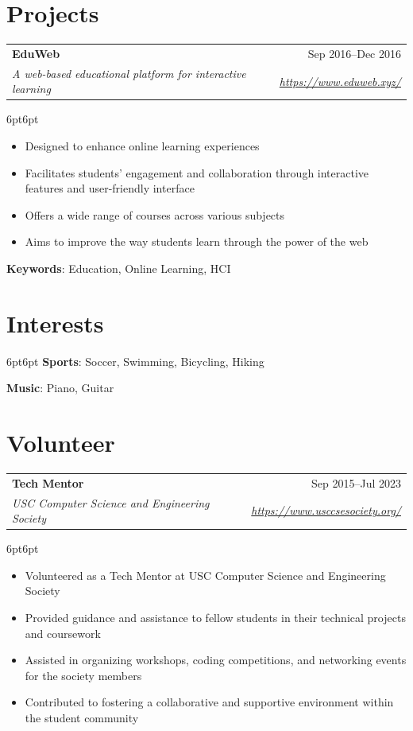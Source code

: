 \documentclass[a4paper,10pt]{article}
\makeatletter
\newcommand{\resumeSubheading}[4]{
  \begin{tabular*}{\textwidth}[t]{l@{\extracolsep{\fill}}r}
    \textbf{#1} & #2 \\
    \textit{#3} & \textit{#4} \\
  \end{tabular*}
}
\makeatother
\begin{document}
\section{Projects}
\resumeSubheading
{EduWeb}{Sep 2016–Dec 2016}
{A web-based educational platform for interactive learning}{\url{https://www.eduweb.xyz/}}
\begin{adjustwidth}{6pt}{6pt}
\begin{itemize}
\item Designed to enhance online learning experiences
\item Facilitates students' engagement and collaboration through interactive features and user-friendly interface
\item Offers a wide range of courses across various subjects
\item Aims to improve the way students learn through the power of the web
\end{itemize}
\textbf{Keywords}: Education, Online Learning, HCI
\end{adjustwidth}
\section{Interests}
\begin{adjustwidth}{6pt}{6pt}
\textbf{Sports}: Soccer, Swimming, Bicycling, Hiking

\textbf{Music}: Piano, Guitar
\end{adjustwidth}
\section{Volunteer}
\resumeSubheading
{Tech Mentor}{Sep 2015–Jul 2023}
{USC Computer Science and Engineering Society}{\url{https://www.usccsesociety.org/}}
\begin{adjustwidth}{6pt}{6pt}
\begin{itemize}
\item Volunteered as a Tech Mentor at USC Computer Science and Engineering Society
\item Provided guidance and assistance to fellow students in their technical projects and coursework
\item Assisted in organizing workshops, coding competitions, and networking events for the society members
\item Contributed to fostering a collaborative and supportive environment within the student community
\end{itemize}
\end{adjustwidth}
\end{document}
